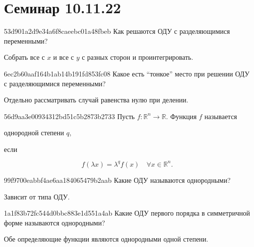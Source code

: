 \section{Семинар 10.11.22}
\begin{note}{53d901a2d9e34a6f8caeebc01a48fbeb}
    Как решаются ОДУ с разделяющимися переменными?

    \begin{cloze}{1}
        Собрать все с \({ x }\) и все с \({ y }\) с разных сторон и проинтегрировать.
    \end{cloze}
\end{note}

\begin{note}{6ec2b60aaf164b1ab14b191fd853fc08}
    Какое есть ``тонкое'' место при решении ОДУ с разделяющимися переменными?

    \begin{cloze}{1}
        Отдельно рассматривать случай равенства нулю при делении.
    \end{cloze}
\end{note}

\begin{note}{56d9aa3e00934312bd51c5b2873b2733}
    Пусть \({ f : \mathbb R^{n} \to \mathbb R }\).
    Функция \({ f }\) называется \begin{icloze}{2}однородной степени \({ q }\),\end{icloze} если
    \begin{icloze}{1}
        \[
            f(\lambda x) = \lambda^{q} f(x) \quad \forall x \in \mathbb R^{n}.
        \]
    \end{icloze}
\end{note}

\begin{note}{99f9700eabbf4ae6aa184065479b2aab}
    Какие ОДУ называются однородными?

    \begin{cloze}{1}
        Зависит от типа ОДУ.
    \end{cloze}
\end{note}

\begin{note}{1a1f83b72fc544d0bbc883e1d551a4ab}
    Какие ОДУ первого порядка в симметричной форме называются однородными?

    \begin{cloze}{1}
        Обе определяющие функции являются однородными одной степени.
    \end{cloze}
\end{note}

